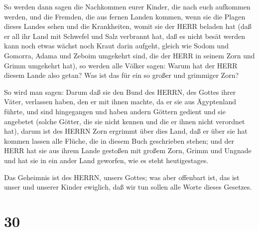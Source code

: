  So werden dann sagen die Nachkommen eurer Kinder, die nach
euch aufkommen werden, und die Fremden, die aus fernen Landen kommen,
wenn sie die Plagen dieses Landes sehen und die Krankheiten, womit sie
der HERR beladen hat  (daß er all ihr Land mit Schwefel und
Salz verbrannt hat, daß es nicht besät werden kann noch etwas wächst
noch Kraut darin aufgeht, gleich wie Sodom und Gomorra, Adama und Zeboim
umgekehrt sind, die der HERR in seinem Zorn und Grimm umgekehrt hat),
 so werden alle Völker sagen: Warum hat der HERR diesem
Lande also getan? Was ist das für ein so großer und grimmiger Zorn?

 So wird man sagen: Darum daß sie den Bund des HERRN, des
Gottes ihrer Väter, verlassen haben, den er mit ihnen machte, da er sie
aus Ägyptenland führte,  und sind hingegangen und haben
andern Göttern gedient und sie angebetet (solche Götter, die sie nicht
kennen und die er ihnen nicht verordnet hat),  darum ist
des HERRN Zorn ergrimmt über dies Land, daß er über sie hat kommen
lassen alle Flüche, die in diesem Buch geschrieben stehen; 
und der HERR hat sie aus ihrem Lande gestoßen mit großem Zorn, Grimm und
Ungnade und hat sie in ein ander Land geworfen, wie es steht
heutigestages.

 Das Geheimnis ist des HERRN, unsers Gottes; was aber
offenbart ist, das ist unser und unserer Kinder ewiglich, daß wir tun
sollen alle Worte dieses Gesetzes.

\hypertarget{section-29}{%
\section{30}\label{section-29}}

